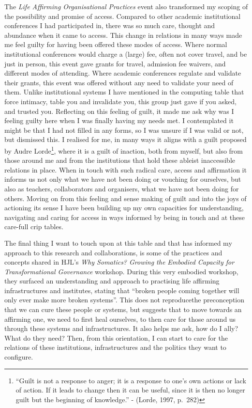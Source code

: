 The \emph{Life Affirming Organisational Practices} event also
transformed my scoping of the possibility and promise of access.
Compared to other academic institutional conferences I had participated
in, there was so much care, thought and abundance when it came to
access. This change in relations in many ways made me feel guilty for
having been offered these modes of access. Where normal institutional
conferences would charge a (large) fee, often not cover travel, and be
just in person, this event gave grants for travel, admission fee
waivers, and different modes of attending. Where academic conferences
regulate and validate their grants, this event was offered without any
need to validate your need of them. Unlike institutional systems I have
mentioned in the computing table that force intimacy, table you and
invalidate you, this group just gave if you asked, and trusted you.
Reflecting on this feeling of guilt, it made me ask why was I feeling
guilty here when I was finally having my needs met. I contemplated it
might be that I had not filled in any forms, so I was unsure if I was
valid or not, but dismissed this. I realised for me, in many ways it
aligns with a guilt proposed by Audre Lorde\footnote{``Guilt is not a
  response to anger; it is a response to one's own actions or lack of
  action. If it leads to change then it can be useful, since it is then
  no longer guilt but the beginning of knowledge.'' - (Lorde, 1997,
  p.~282)}, where it is a guilt of inaction, both from myself, but also
from those around me and from the institutions that hold these ableist
inaccessible relations in place. When in touch with such radical care,
access and affirmation it informs us not only what we have not been
doing or vouching for ourselves, but also as teachers, collaborators and
organisers, what we have not been doing for others. Moving on from this
feeling and sense making of guilt and into the joys of actioning its
sense I have been building up my own capacities for understanding,
navigating and caring for access in ways informed by being in touch and
at these care-full crip tables.

The final thing I want to touch upon at this table and that has informed
my approach to this research and collaborations, is some of the
practices and concepts shared in HJL's \emph{Why Somatics? Growing the
Embodied Capacity for Transformational Governance} workshop. During this
very embodied workshop, they surfaced an understanding and approach to
practising life affirming infrastructures and institutes, stating that
``broken people coming together will only ever make more broken
systems''. This does not reproducethe preconception that we can cure
these people or systems, but suggests that to move towards an affirming
one, we need to first heal ourselves, to then care for those around us
through these systems and infrastructures. It also helps me ask, how do
I ally? What do they need? Then, from this orientation, I can start to
care for the relations of these institutions, infrastructures and the
politics they want to configure.

